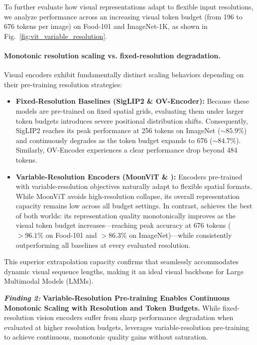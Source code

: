 To further evaluate how visual representations adapt to flexible input resolutions, we analyze performance across an increasing visual token budget (from 196 to 676 tokens per image) on Food-101 and ImageNet-1K, as shown in Fig.~\ref{fig:vit_variable_resolution}.

\paragraph{Monotonic resolution scaling vs. fixed-resolution degradation.}
Visual encoders exhibit fundamentally distinct scaling behaviors depending on their pre-training resolution strategies:
\begin{itemize}[leftmargin=*]
    \item \textbf{Fixed-Resolution Baselines (SigLIP2 \& OV-Encoder):} Because these models are pre-trained on fixed spatial grids, evaluating them under larger token budgets introduces severe positional distribution shifts. Consequently, SigLIP2 reaches its peak performance at 256 tokens on ImageNet ($\sim 85.9\%$) and continuously degrades as the token budget expands to 676 ($\sim 84.7\%$). Similarly, OV-Encoder experiences a clear performance drop beyond 484 tokens.
    \item \textbf{Variable-Resolution Encoders (MoonViT \& \magevit):} Encoders pre-trained with variable-resolution objectives naturally adapt to flexible spatial formats. While MoonViT avoids high-resolution collapse, its overall representation capacity remains low across all budget settings. In contrast, \magevit achieves the best of both worlds: its representation quality monotonically improves as the visual token budget increases—reaching peak accuracy at 676 tokens ($>96.1\%$ on Food-101 and $>86.3\%$ on ImageNet)—while consistently outperforming all baselines at every evaluated resolution.
\end{itemize}
This superior extrapolation capacity confirms that \magevit seamlessly accommodates dynamic visual sequence lengths, making it an ideal visual backbone for Large Multimodal Models (LMMs).

\begin{promptbox}
\large
\textbf{\textit{Finding 2:}}
\textbf{Variable-Resolution Pre-training Enables Continuous Monotonic Scaling with Resolution and Token Budgets.}
While fixed-resolution vision encoders suffer from sharp performance degradation when evaluated at higher resolution budgets, \magevit leverages variable-resolution pre-training to achieve continuous, monotonic quality gains without saturation.
\end{promptbox}


